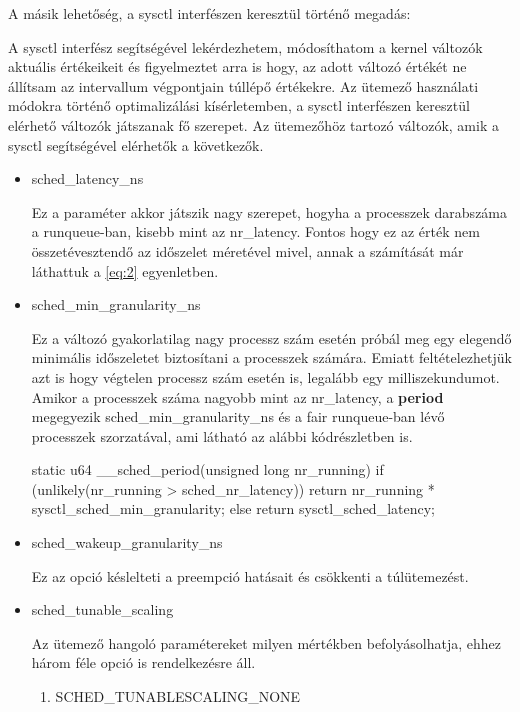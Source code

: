 A másik lehetőség, a sysctl interfészen keresztül történő megadás:
A sysctl interfész segítségével lekérdezhetem, módosíthatom a kernel változók aktuális értékeikeit és figyelmeztet arra is hogy, az adott változó értékét ne állítsam az intervallum végpontjain túllépő értékekre.
Az ütemező használati módokra történő optimalizálási kísérletemben, a sysctl interfészen keresztül elérhető változók játszanak fő szerepet. Az ütemezőhöz tartozó változók, amik a sysctl segítségével elérhetők a következők.
\begin{itemize}
\item sched\_latency\_ns

Ez a paraméter akkor játszik nagy szerepet, hogyha a processzek darabszáma a runqueue-ban, kisebb mint az nr\_latency. Fontos hogy ez az érték nem összetévesztendő az időszelet méretével mivel, annak a számítását már láthattuk a \ref{eq:2} egyenletben. 

\item sched\_min\_granularity\_ns

Ez a változó gyakorlatilag nagy processz szám esetén próbál meg egy elegendő minimális időszeletet biztosítani a processzek számára. Emiatt feltételezhetjük azt is hogy végtelen processz szám esetén is, legalább egy milliszekundumot.
Amikor a processzek száma nagyobb mint az nr\_latency, a \textbf{period} megegyezik sched\_min\_granularity\_ns és a fair runqueue-ban lévő processzek szorzatával, ami látható az alábbi kódrészletben is.

\begin{cpp}
static u64 __sched_period(unsigned long nr_running)
{
	if (unlikely(nr_running > sched_nr_latency))
		return nr_running * sysctl_sched_min_granularity;
	else
		return sysctl_sched_latency;
}
\end{cpp}

\item sched\_wakeup\_granularity\_ns

Ez az opció késlelteti a preempció hatásait és csökkenti a túlütemezést.

\item sched\_tunable\_scaling

Az ütemező hangoló paramétereket milyen mértékben befolyásolhatja, ehhez három féle opció is rendelkezésre áll.
\begin{enumerate}
\item SCHED\_TUNABLESCALING\_NONE


\end{enumerate}
\end{itemize}
